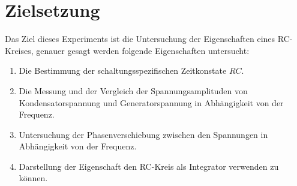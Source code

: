 \section{Zielsetzung}
\label{sec:Zielsetzung}


Das Ziel dieses Experiments ist die Untersuchung der Eigenschaften eines RC-Kreises, genauer gesagt werden folgende Eigenschaften untersucht:
\begin{enumerate}[label=\alph*)]
    \item Die Bestimmung der schaltungsspezifischen Zeitkonstate $RC$.
    \item Die Messung und der Vergleich der Spannungsamplituden von Kondensatorspannung und Generatorspannung in Abhängigkeit von der Frequenz.
    \item Untersuchung der Phasenverschiebung zwischen den Spannungen in Abhängigkeit von der Frequenz.
    \item Darstellung der Eigenschaft den RC-Kreis als Integrator verwenden zu können.
\end{enumerate}